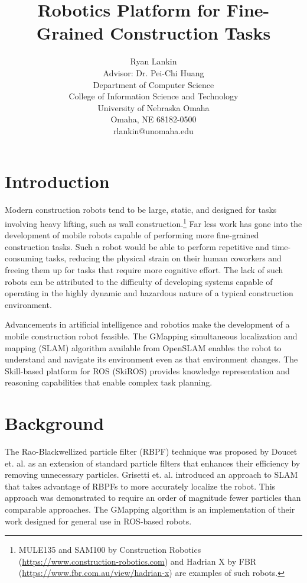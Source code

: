 \documentclass[12pt]{article}
\title{Robotics Platform for Fine-Grained Construction Tasks}
\author{Ryan Lankin\\Advisor: Dr. Pei-Chi Huang\\Department of Computer Science\\College of Information Science and Technology\\University of Nebraska Omaha\\Omaha, NE 68182-0500\\rlankin@unomaha.edu}
\begin{document}
    \maketitle

    \section{Introduction}
    Modern construction robots tend to be large, static, and designed for tasks involving heavy lifting, such as wall construction.\footnote{MULE135 and SAM100 by Construction Robotics (\href{https://www.construction-robotics.com}{https://www.construction-robotics.com}) and Hadrian X by FBR (\href{https://www.fbr.com.au/view/hadrian-x}{https://www.fbr.com.au/view/hadrian-x}) are examples of such robots.} Far less work has gone into the development of mobile robots capable of performing more fine-grained construction tasks. Such a robot would be able to perform repetitive and time-consuming tasks, reducing the physical strain on their human coworkers and freeing them up for tasks that require more cognitive effort. The lack of such robots can be attributed to the difficulty of developing systems capable of operating in the highly dynamic and hazardous nature of a typical construction environment.

    Advancements in artificial intelligence and robotics make the development of a mobile construction robot feasible. The GMapping simultaneous localization and mapping (SLAM) algorithm available from OpenSLAM \cite{gmapping} enables the robot to understand and navigate its environment even as that environment changes. The Skill-based platform for ROS (SkiROS) \cite{rovida2017skiros} provides knowledge representation and reasoning capabilities that enable complex task planning.

    \section{Background}

    The Rao-Blackwellized particle filter (RBPF) technique was proposed by Doucet et. al. \cite{doucet2000rao} as an extension of standard particle filters that enhances their efficiency by removing unnecessary particles. Grisetti et. al. introduced an approach to SLAM \cite{grisetti2005improving, grisetti2007improved} that takes advantage of RBPFs to more accurately localize the robot. This approach was demonstrated to require an order of magnitude fewer particles than comparable approaches. The GMapping algorithm is an implementation of their work designed for general use in ROS-based robots.
\end{document}

